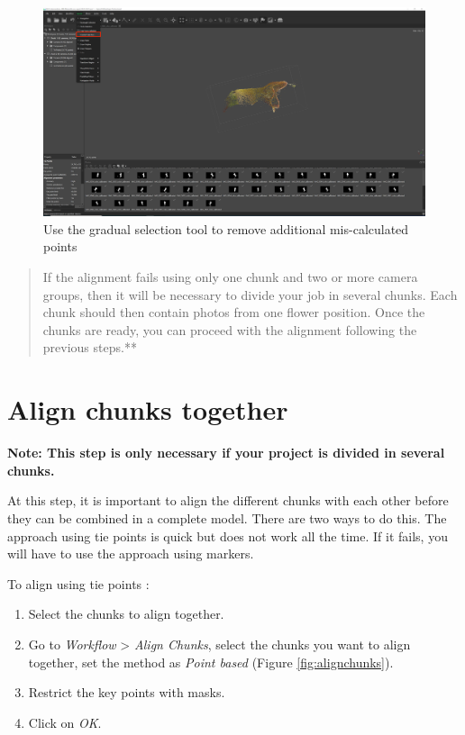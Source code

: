 \documentclass[
]{book}
\begin{document}
\begin{figure}

{\centering \includegraphics[width=1\linewidth]{Figures/metashape_gradual_selection} 

}

\caption{Use the gradual selection tool to remove additional mis-calculated points}\label{fig:removepoints2}
\end{figure}

\begin{quote}
If the alignment fails using only one chunk and two or more
camera groups, then it will be necessary to divide your job in several
chunks. Each chunk should then contain photos from one flower position.
Once the chunks are ready, you can proceed with the alignment following
the previous steps.**
\end{quote}

\hypertarget{align-chunks-together}{%
\section{Align chunks together}\label{align-chunks-together}}

\textbf{Note: This step is only necessary if your project is divided in
several chunks.}

At this step, it is important to align the different chunks with each
other before they can be combined in a complete model. There are two
ways to do this. The approach using tie points is quick but does not
work all the time. If it fails, you will have to use the approach using
markers.

To align using tie points :

\begin{enumerate}
\def\labelenumi{\arabic{enumi}.}
\item
  Select the chunks to align together.
\item
  Go to \emph{Workflow} \textgreater{} \emph{Align Chunks}, select the chunks you want to
  align together, set the method as \emph{Point based} (Figure \ref{fig:alignchunks}).
\item
  Restrict the key points with masks.
\item
  Click on \emph{OK}.
\end{enumerate}
\end{document}
